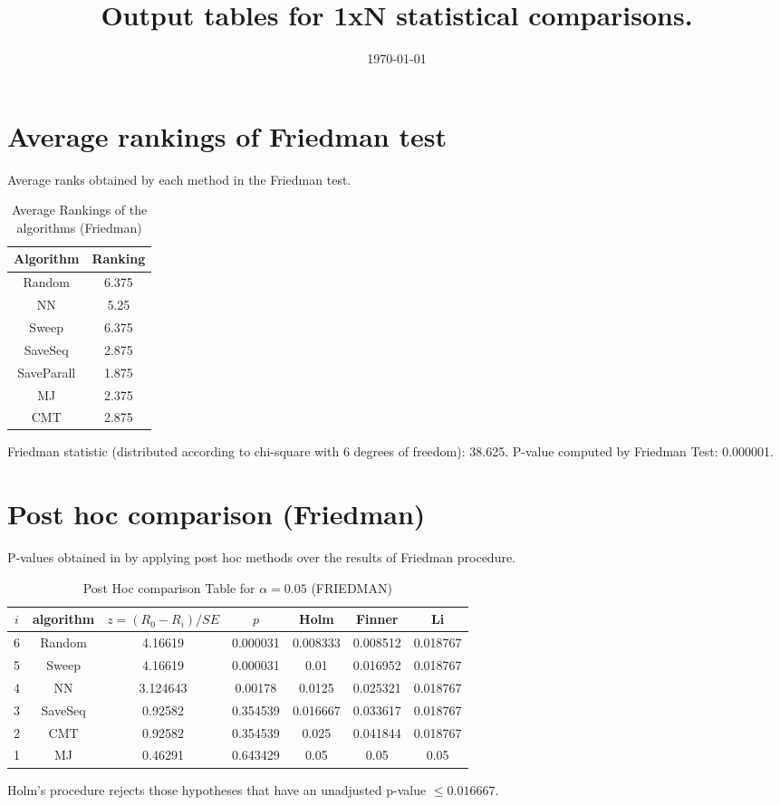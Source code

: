 \documentclass[a4paper,10pt]{article}
\title{Output tables for 1xN statistical comparisons.}
\author{}
\date{\today}
\begin{document}
\begin{landscape}
\pagestyle{empty}
\maketitle
\thispagestyle{empty}

\section{Average rankings of Friedman test}


Average ranks obtained by each method in the Friedman test.

\begin{table}[!htp]
\centering
\begin{tabular}{|c|c|}\hline
Algorithm&Ranking\\\hline
Random&6.375\\NN&5.25\\Sweep&6.375\\SaveSeq&2.875\\SaveParall&1.875\\MJ&2.375\\CMT&2.875\\\hline\end{tabular}
\caption{Average Rankings of the algorithms (Friedman)}
\end{table}

Friedman statistic (distributed according to chi-square with 6 degrees of freedom): 38.625. \newline P-value computed by Friedman Test: 0.000001.\newline


\newpage

\section{Post hoc comparison (Friedman)}


P-values obtained in by applying post hoc methods over the results of Friedman procedure.

\begin{table}[!htp]
\centering\footnotesize
\begin{tabular}{ccccccc}
$i$&algorithm&$z=(R_0 - R_i)/SE$&$p$&Holm &Finner&Li\\
\hline6&Random&4.16619&0.000031&0.008333&0.008512&0.018767\\5&Sweep&4.16619&0.000031&0.01&0.016952&0.018767\\4&NN&3.124643&0.00178&0.0125&0.025321&0.018767\\3&SaveSeq&0.92582&0.354539&0.016667&0.033617&0.018767\\2&CMT&0.92582&0.354539&0.025&0.041844&0.018767\\1&MJ&0.46291&0.643429&0.05&0.05&0.05\\\hline
\end{tabular}
\caption{Post Hoc comparison Table for $\alpha=0.05$ (FRIEDMAN)}
\end{table}Holm's procedure rejects those hypotheses that have an unadjusted p-value $\le0.016667$.


\end{landscape}
\end{document}
